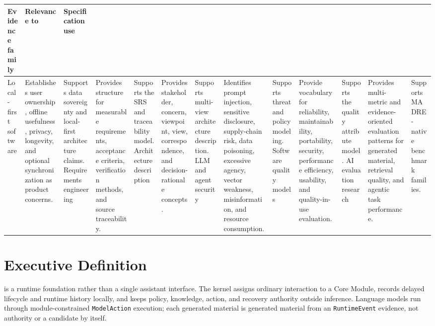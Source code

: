 \begin{tabularx}{.95\linewidth}{@{}lX X@{}}
	\toprule
	\textbf{Evidence family} & \textbf{Relevance to \madre} & \textbf{Specification use} \\
	\midrule
	Local-first software & Establishes user ownership, offline usefulness, privacy, longevity, and optional synchronization as product concerns. & Supports data sovereignty and local-first architecture claims. \n
	Requirements engineering & Provides structure for measurable requirements, acceptance criteria, verification methods, and source traceability. & Supports the SRS and traceability model. \n
	Architecture description & Provides stakeholder, concern, viewpoint, view, correspondence, and decision-rationale concepts. & Supports multi-view architecture description. \n
	LLM and agent security & Identifies prompt injection, sensitive disclosure,	supply-chain risk, data poisoning, excessive agency, vector weakness, misinformation, and resource consumption. & Supports threat and policy modeling. \n
	Software quality models & Provide vocabulary for reliability, maintainability, portability, security, performance efficiency, usability, and quality-in-use evaluation. & Supports the quality attribute model. \n
	AI evaluation research & Provides multi-metric and evidence-oriented evaluation patterns for generated material, retrieval quality, and agentic task performance. & Supports MADRE-native benchmark families. \\
	\bottomrule
\end{tabularx}


\section{Executive Definition}

\Madre is a runtime foundation rather than a single assistant interface. The kernel assigns ordinary interaction to a Core Module, records delayed lifecycle and runtime history locally, and keeps policy, knowledge, action, and recovery authority outside inference. Language models run through module-constrained \texttt{ModelAction} execution; each generated material is generated material from an \texttt{RuntimeEvent} evidence, not authority or a candidate by itself.


